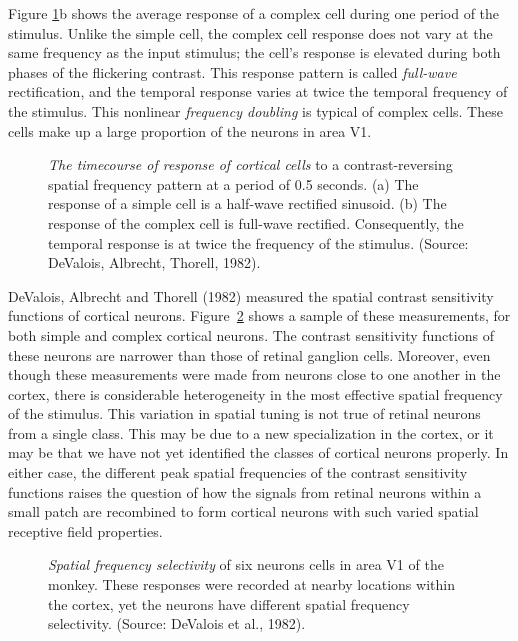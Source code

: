 Figure \ref{f5:SimpleComplex}b shows the average response
of a complex cell during one period of the stimulus.
Unlike the simple cell,
the complex cell response does not vary at the same
frequency as the input stimulus;
the cell's response is elevated during
both phases of the flickering contrast.
This response pattern is called {\em full-wave} rectification,
and the temporal response varies
at twice the temporal frequency of the stimulus.
This nonlinear {\em frequency doubling} is typical of complex
cells.
These cells make up a large proportion of the neurons in area V1.

\begin{figure}
\centerline {
}
\caption[Simple and Complex Cell Responses]{
{\em The timecourse of response of cortical cells} 
to a contrast-reversing spatial frequency pattern
at a period of 0.5 seconds.
(a) The response of a simple cell
is a half-wave rectified sinusoid.
(b) The response of the complex cell is full-wave rectified.
Consequently, the temporal response
is at twice the frequency of the stimulus.
(Source: DeValois, Albrecht, Thorell, 1982). 
}
\label{f5:SimpleComplex}
\end{figure}
DeValois, Albrecht and Thorell (1982)
measured the spatial contrast sensitivity functions of
cortical neurons.
Figure~\ref{f5:corticalTuning} shows
a sample of these measurements,
for both simple and complex cortical neurons.
The contrast sensitivity functions
of these neurons are narrower
than those of retinal ganglion cells.
Moreover, even though these measurements were made from neurons
close to one another in the cortex,
there is considerable heterogeneity in the most effective
spatial frequency of the stimulus.
This variation in spatial tuning is not true of retinal
neurons from a single class.
This may be due to a new specialization in the cortex, or
it may be that we have not yet identified the classes of
cortical neurons properly.
In either case, the different peak spatial frequencies
of the contrast sensitivity functions
raises the question of how the signals from retinal
neurons within a small patch
are recombined to form cortical neurons with
such varied spatial receptive field properties.
\begin{figure}
\centerline {
}
\caption[Spatial Frequency Tuning of V1 cells]{
{\em Spatial frequency selectivity}
of six neurons cells in area V1 of the monkey.
These responses were recorded at nearby locations within the
cortex,
yet the neurons have different spatial frequency selectivity.
(Source: DeValois et al., 1982).
}
\label{f5:corticalTuning}
\end{figure}

